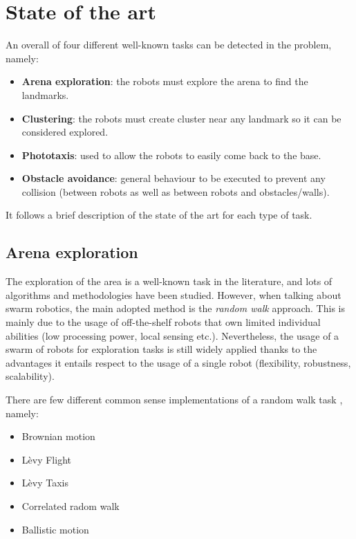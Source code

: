 \chapter{State of the art}

An overall of four different well-known tasks can be detected in the problem, namely:

\begin{itemize}

  \item \textbf{Arena exploration}: the robots must explore the arena to find the landmarks.
  \item \textbf{Clustering}: the robots must create cluster near any landmark so it can be considered explored.
  \item \textbf{Phototaxis}: used to allow the robots to easily come back to the base.
  \item \textbf{Obstacle avoidance}: general behaviour to be executed to prevent any collision (between robots as well as between robots and obstacles/walls).

\end{itemize}

\noindent
It follows a brief description of the state of the art for each type of task.

\section{Arena exploration}

The exploration of the area is a well-known task in the literature, and lots of algorithms and methodologies have been studied. However, when talking about swarm robotics, the main adopted method is the \textit{random walk} approach. This is mainly due to the usage of off-the-shelf robots that own limited individual abilities (low processing power, local sensing etc.). Nevertheless, the usage of a swarm of robots for exploration tasks is still widely applied thanks to the advantages it entails respect to the usage of a single robot (flexibility, robustness, scalability).

\bigskip
There are few different common sense implementations of a random walk task \cite{rw-summary}, namely:

\begin{itemize}

  \item {Brownian motion}
  
  \item {Lèvy Flight}
  
  \item {Lèvy Taxis}

  \item {Correlated radom walk}

  \item{Ballistic motion}  
\end{itemize}
 
